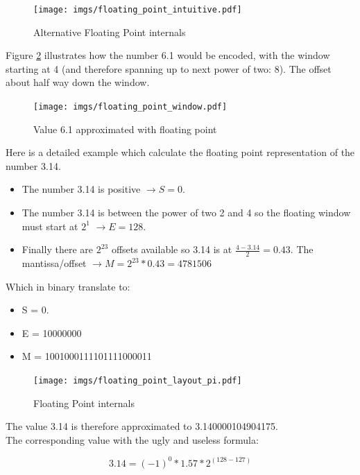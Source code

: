 \documentclass[book.tex]{subfiles}
\begin{document}
\begin{figure}[H]
\centering
\texttt{[image: imgs/floating\_point\_intuitive.pdf]}
\caption{Alternative Floating Point internals}
\label{fig:fp_internals}
\end{figure}
  \bigskip  

Figure \ref{fig:fp_internals_window} illustrates how the number 6.1 would be encoded, with the window starting at 4 (and therefore spanning up to next power of two: 8). The offset about half way down the window.

\begin{figure}[H]
\centering
\texttt{[image: imgs/floating\_point\_window.pdf]}

\caption{Value 6.1 approximated with floating point}
\label{fig:fp_internals_window}
\end{figure}
  \bigskip
  
Here is a detailed example which calculate the floating point representation of the number 3.14.
\begin{itemize}
 \item The number 3.14 is positive  $\rightarrow S=0$.
 \item The number 3.14 is between the power of two 2 and 4 so the floating window must start at $2^1$  $\rightarrow E=128$.
 \item Finally there are $2^{23}$ offsets available so 3.14 is at $\frac{4-3.14}{2} = 0.43 $. The mantissa/offset $\rightarrow M = 2^{23}*0.43 = 4781506$
\end{itemize}

Which in binary translate to:

\begin{itemize}
\item S = 0.
\item E = 10000000
\item M = 1001000111101111000011
\end{itemize}

\begin{figure}[H]
\centering
\texttt{[image: imgs/floating\_point\_layout\_pi.pdf]}
\caption{Floating Point internals}
\label{fig:fp_internals}
\end{figure}
  \bigskip

The value 3.14 is therefore approximated to 3.140000104904175.\\

The corresponding value with the ugly and useless formula:

\begin{equation}
3.14 = (-1)^0 * 1.57 * 2^{(128-127)}
\end{equation}
\end{document}
